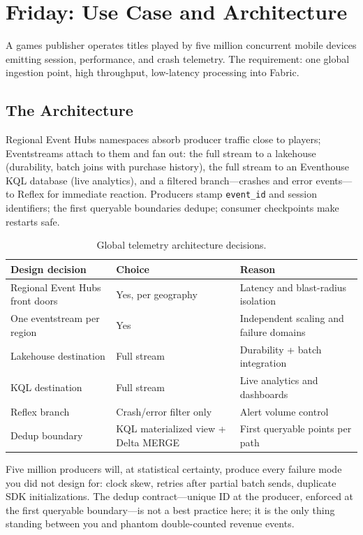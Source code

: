 \section{Friday: Use Case and Architecture}
A games publisher operates titles played by five million concurrent mobile devices emitting session, performance, and crash telemetry. The requirement: one global ingestion point, high throughput, low-latency processing into Fabric.

\subsection{The Architecture}
Regional Event Hubs namespaces absorb producer traffic close to players; Eventstreams attach to them and fan out: the full stream to a lakehouse (durability, batch joins with purchase history), the full stream to an Eventhouse KQL database (live analytics), and a filtered branch---crashes and error events---to Reflex for immediate reaction. Producers stamp \texttt{event\_id} and session identifiers; the first queryable boundaries dedupe; consumer checkpoints make restarts safe.

\begin{table}[H]
\centering
\small
\begin{tabular}{@{}p{4.2cm}p{5.2cm}p{4.6cm}@{}}
\toprule
\textbf{Design decision} & \textbf{Choice} & \textbf{Reason} \\
\midrule
Regional Event Hubs front doors & Yes, per geography & Latency and blast-radius isolation \\
One eventstream per region & Yes & Independent scaling and failure domains \\
Lakehouse destination & Full stream & Durability + batch integration \\
KQL destination & Full stream & Live analytics and dashboards \\
Reflex branch & Crash/error filter only & Alert volume control \\
Dedup boundary & KQL materialized view + Delta MERGE & First queryable points per path \\
\bottomrule
\end{tabular}
\caption{Global telemetry architecture decisions.}
\label{tab:chapter13-games}
\end{table}

\begin{pitfall}
Five million producers will, at statistical certainty, produce every failure mode you did not design for: clock skew, retries after partial batch sends, duplicate SDK initializations. The dedup contract---unique ID at the producer, enforced at the first queryable boundary---is not a best practice here; it is the only thing standing between you and phantom double-counted revenue events.
\end{pitfall}

